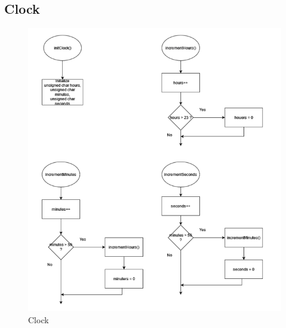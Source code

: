 \documentclass[a4paper,12pt]{article}
\begin{document}
\subsection{Clock}
\begin{figure}[H]
    \centering
    \includegraphics[width=1\textwidth]{diagrams/clock.png}
    \caption{Clock}
    \label{fig:MainClock}
\end{figure}
\end{document}
